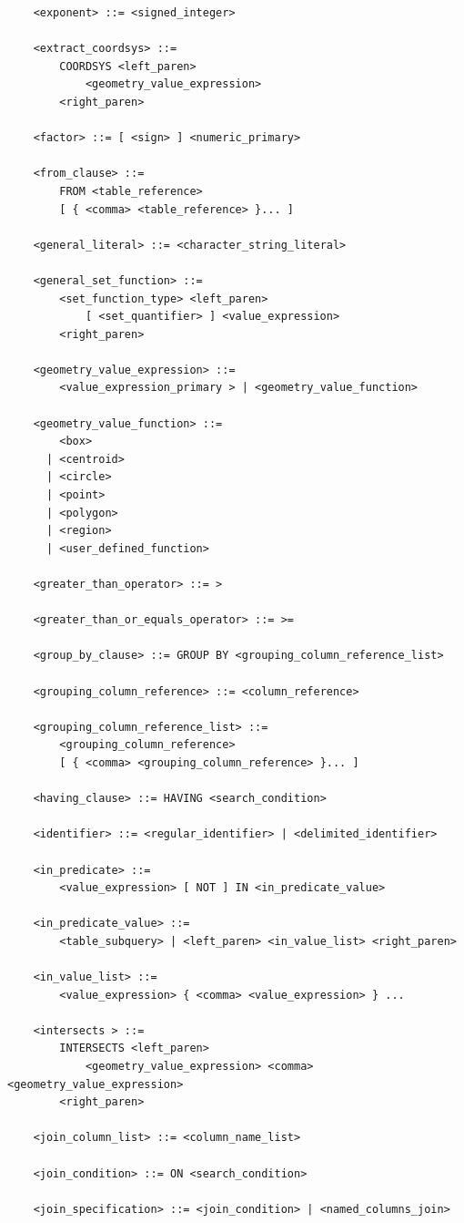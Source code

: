 \documentclass[11pt,a4paper]{ivoa}
\begin{document}
\begin{verbatim}
    <exponent> ::= <signed_integer>

    <extract_coordsys> ::=
        COORDSYS <left_paren>
            <geometry_value_expression>
        <right_paren>

    <factor> ::= [ <sign> ] <numeric_primary>

    <from_clause> ::=
        FROM <table_reference>
	    [ { <comma> <table_reference> }... ]

    <general_literal> ::= <character_string_literal>

    <general_set_function> ::=
        <set_function_type> <left_paren>
            [ <set_quantifier> ] <value_expression>
        <right_paren>

    <geometry_value_expression> ::=
        <value_expression_primary > | <geometry_value_function>

    <geometry_value_function> ::=
        <box>
      | <centroid>
      | <circle>
      | <point>
      | <polygon>
      | <region>
      | <user_defined_function>

    <greater_than_operator> ::= >

    <greater_than_or_equals_operator> ::= >=

    <group_by_clause> ::= GROUP BY <grouping_column_reference_list>

    <grouping_column_reference> ::= <column_reference>

    <grouping_column_reference_list> ::=
        <grouping_column_reference>
        [ { <comma> <grouping_column_reference> }... ]

    <having_clause> ::= HAVING <search_condition>

    <identifier> ::= <regular_identifier> | <delimited_identifier>

    <in_predicate> ::=
        <value_expression> [ NOT ] IN <in_predicate_value>

    <in_predicate_value> ::=
        <table_subquery> | <left_paren> <in_value_list> <right_paren>

    <in_value_list> ::=
        <value_expression> { <comma> <value_expression> } ...

    <intersects > ::=
        INTERSECTS <left_paren>
            <geometry_value_expression> <comma> <geometry_value_expression>
        <right_paren>

    <join_column_list> ::= <column_name_list>

    <join_condition> ::= ON <search_condition>

    <join_specification> ::= <join_condition> | <named_columns_join>


\end{verbatim}
\end{document}
